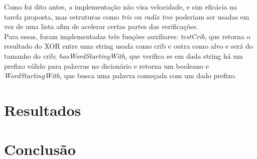 \documentclass[10pt]{article}
\begin{document}
        Como foi dito antes, a implementação não visa velocidade, e sim eficácia na tarefa proposta, mas estruturas como \textit{trie} ou \textit{radix tree} poderiam ser usadas em vez de uma lista afim de acelerar certas partes das verificações.\\

        Para essas, foram implementadas três funções auxiliares: \textit{testCrib}, que retorna o resultado do XOR entre uma string usada como crib e outra como alvo e será do tamanho do crib; \textit{hasWordStartingWith}, que verifica se em dada string há um prefixo válido para palavras no dicionário e retorna um booleano e \textit{WordStartingWith}, que busca uma palavra começada com um dado prefixo. 

    \section{Resultados}

    \section{Conclusão}
\end{document}
